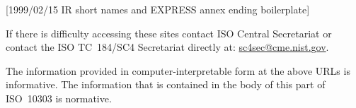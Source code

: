 [1999/02/15 IR short names and EXPRESS annex ending boilerplate]

    If there is difficulty accessing these sites contact ISO Central
Secretariat or contact the ISO TC~184/SC4 Secretariat directly at:
\url{sc4sec@cme.nist.gov}.

\begin{anote}The information provided in computer-interpretable form at
       the above URLs is informative. The information that is contained
       in the body of this part of ISO~10303 is normative.
\end{anote}

\endinput
